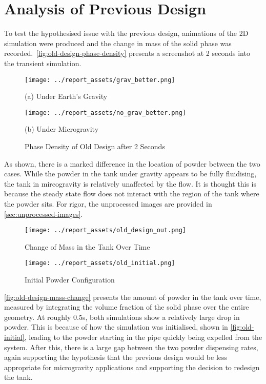 \section{Analysis of Previous Design}\label{sec:prev-design-analysis}
To test the hypothesised issue with the previous design, animations of the 2D simulation were produced and the change in mass of the solid phase was recorded.~\autoref{fig:old-design-phase-density} presents a screenshot at 2 seconds into the transient simulation. 
\begin{figure}[htbp]
    \centering
    
    \begin{minipage}{0.4\textwidth}
        \centering
        \texttt{[image: ../report\_assets/grav\_better.png]}
        \caption*{(a) Under Earth's Gravity}
    \end{minipage}
    \hfill
    \begin{minipage}{0.4\textwidth}
        \centering
        \texttt{[image: ../report\_assets/no\_grav\_better.png]}
        \caption*{(b) Under Microgravity}
    \end{minipage}
    \caption{Phase Density of Old Design after 2 Seconds}\label{fig:old-design-phase-density}
\end{figure}
As shown, there is a marked difference in the location of powder between the two cases. While the powder in the tank under gravity appears to be fully fluidising, the tank in mircogravity is relatively unaffected by the flow. It is thought this is because the steady state flow does not interact with the region of the tank where the powder sits. For rigor, the unprocessed images are provided in \autoref{sec:unprocessed-images}.

\begin{figure}[htbp]
    \centering
    
    \begin{minipage}{0.54\textwidth}
        \centering
        \texttt{[image: ../report\_assets/old\_design\_out.png]}
        \caption{Change of Mass in the Tank Over Time}\label{fig:old-design-mass-change}
    \end{minipage}
    \hfill
    \begin{minipage}{0.4\textwidth}
        \centering
        \texttt{[image: ../report\_assets/old\_initial.png]}
        \caption{Initial Powder Configuration}\label{fig:old-initial}
    \end{minipage}
\end{figure}
\autoref{fig:old-design-mass-change} presents the amount of powder in the tank over time, measured by integrating the volume fraction of the solid phase over the entire geometry. At roughly 0.5s, both simulations show a relatively large drop in powder. This is because of how the simulation was initialised, shown in \autoref{fig:old-initial}, leading to the powder starting in the pipe quickly being expelled from the system. After this, there is a large gap between the two powder dispensing rates, again supporting the hypothesis that the previous design would be less appropriate for microgravity applications and supporting the decision to redesign the tank. 

